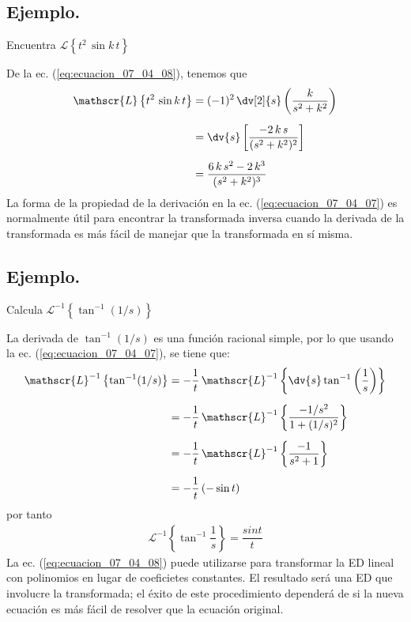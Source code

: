 \subsection*{Ejemplo.}
Encuentra $\mathscr{L} \left\{ t^{2} \, \sin k \, t \right\}$
\par
De la ec. (\ref{eq:ecuacion_07_04_08}), tenemos que
\begin{align}
\begin{aligned}
\mathscr{L} \left\{ t^{2} \, \sin k \, t \right\} &= (-1)^{2} \, \dv[2]{s} \left( \dfrac{k}{s^{2} + k^{2}} \right) \\[0.5em]
&= \dv{s} \left[ \dfrac{-2 \, k \, s}{(s^{2} + k^{2})^{2}} \right] \\[0.5em]
&= \dfrac{6 \, k \, s^{2} - 2 \, k^{3}}{(s^{2} + k^{2})^{3}}  
\end{aligned}
\label{eq:ecuacion_07_04_09}
\end{align}
La forma de la propiedad de la derivación en la ec. (\ref{eq:ecuacion_07_04_07}) es normalmente útil para encontrar la transformada inversa cuando la derivada de la transformada es más fácil de manejar que la transformada en sí misma.
\subsection*{Ejemplo.}
Calcula $\mathscr{L}^{-1} \left\{ \tan^{-1} (1/s) \right\}$
\par
La derivada de $\tan^{-1}(1/s)$ es una función racional simple, por lo que usando la ec. (\ref{eq:ecuacion_07_04_07}), se tiene que:
\begin{align*}
\mathscr{L}^{-1} \left\{ \tan^{-1} (1/s) \right\} &= -\dfrac{1}{t} \, \mathscr{L}^{-1} \left\{ \dv{s} \tan^{-1} \left( \dfrac{1}{s} \right) \right\} \\[0.5em]
&= -\dfrac{1}{t} \, \mathscr{L}^{-1} \left\{ \dfrac{-1/s^{2}}{1 + (1/s)^{2}} \right\} \\[0.5em]
&= -\dfrac{1}{t} \, \mathscr{L}^{-1} \left\{ \dfrac{-1}{s^{2} + 1} \right\} \\[0.5em]
&= -\dfrac{1}{t} \,(- \sin t)
\end{align*}
por tanto
\begin{align*}
\mathscr{L}^{-1} \left\{ \tan^{-1} \dfrac{1}{s} \right\} = \dfrac{sin t}{t}
\end{align*}
La ec. (\ref{eq:ecuacion_07_04_08}) puede utilizarse para transformar la ED lineal con polinomios en lugar de coeficietes constantes. El resultado será una ED que involucre la transformada; el éxito de este procedimiento dependerá de si la nueva ecuación es más fácil de resolver que la ecuación original.
